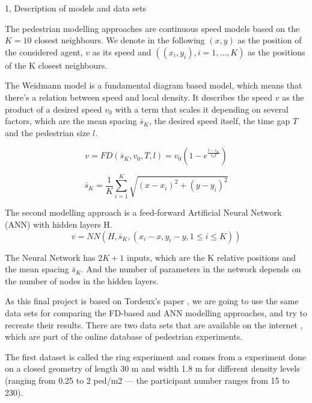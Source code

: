 \documentclass[10pt,a4paper]{article}
\begin{document}
\begin{task}{1, Description of models and data sets}

The pedestrian modelling approaches are continuous speed models based on the $K = 10$ closest neighbours. We denote in the following $(x, y)$ as the position of the considered agent, $v$ as its speed and $((x_i,y_i),i = 1,...,K)$ as the positions of the K closest neighbours.

The Weidmann model is a fundamental diagram based model, which means that there's a relation between speed and local density. It describes the speed $v$ as the product of a desired speed $v_0$ with a term that scales it depending on several factors, which are the mean spacing $\bar{s}_{K}$, the desired speed itself, the time gap $T$ and the pedestrian size $l$.

\begin{equation} 
    v = FD(\bar{s}_{K}, v_0, T, l) = v_0(1-e^{\frac{l-\bar{s}_{K}}{v_{0}T}})
    \label{weidmann}
\end{equation}

\begin{equation}
    \bar{s}_{K} = \frac{1}{K} \sum_{i = 1}^{K} \sqrt{(x - x_{i})^{2} + (y - y_{i})^{2}}
    \label{mean_space}
\end{equation}

The second modelling approach is a feed-forward Artificial Neural Network (ANN) with hidden layers H.
\begin{equation}
    v = NN(H, \bar{s}_{K}, (x_{i} - x, y_{i} - y, 1 \leq i \leq K))
\end{equation}

The Neural Network has $2K + 1$ inputs, which are the K relative positions and the mean spacing $\bar{s}_{K}$. And the number of parameters in the network depends on the number of nodes in the hidden layers.

\bigskip

As this final project is based on Tordeux's paper \cite{Tordeux}, we are going to use the same data sets for comparing the FD-based and ANN modelling approaches, and try to recreate their results. There are two data sets that are available on the internet \cite{DataSet}, which are part of the online database of pedestrian experiments.

The first dataset is called the ring experiment and comes from a experiment done on a closed geometry of length 30 m and width 1.8 m for different density levels (ranging from 0.25 to 2 ped/m2 — the participant number ranges from 15 to 230).


\end{task}
\end{document}
